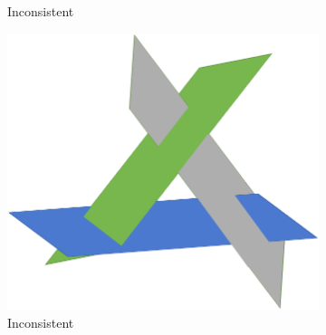 \documentclass[10pt, journal, letterpaper]{IEEEtran}
\begin{document}
\begin{figure}[hbt!]
\begin{subfigure}{0.49\columnwidth}
          \caption{Inconsistent}
          \label{fig:linear_systems_inconsistent1}
    \end{subfigure}
    \begin{subfigure}{0.49\columnwidth}
          \centering
          \includegraphics[width=\columnwidth]{img/Inconsistent3D2.png}
          \caption{Inconsistent}
          \label{fig:linear_systems_inconsistent2}
    \end{subfigure}
    \begin{subfigure}{0.49\columnwidth}
          \centering

\end{subfigure}
\end{figure}
\end{document}
